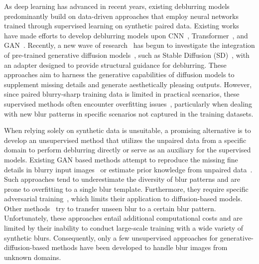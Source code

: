 As deep learning has advanced in recent years, existing deblurring models predominantly build on data-driven approaches that employ neural networks trained through supervised learning on synthetic paired data. Existing works have made efforts to develop deblurring models upon CNN~\cite{tao2018scale,nah2017deep}, Transformer~\cite{potlapalli2024promptir,chee2018airnet}, and GAN~\cite{kupyn2018deblurgan,zhang2019gan}. Recently, a new wave of research~\cite{zhang2024diff,lin2025diffbir,liu2024diff} has begun to investigate the integration of pre-trained generative diffusion models~\cite{ho2020denoising}, such as Stable Diffusion (SD)~\cite{rombach2022high}, with an adapter designed to provide structural guidance for deblurring. These approaches aim to harness the generative capabilities of diffusion models to supplement missing details and generate aesthetically pleasing outputs. However, since paired blurry-sharp training data is limited in practical scenarios, these supervised methods often encounter overfitting issues~\cite{pham2024blur2blur}, particularly when dealing with new blur patterns in specific scenarios not captured in the training datasets. 


When relying solely on synthetic data is unsuitable, a promising alternative is to develop an unsupervised method that utilizes the unpaired data from a specific domain to perform deblurring directly or serve as an auxiliary for the supervised models. Existing GAN based methods attempt to reproduce the missing fine details in blurry input images~\cite{yi2017dualgan,zhao2022fcl} or estimate prior knowledge from unpaired data~\cite{zhang2023neural,jiangxin2021learning,ren2020neural,jiang2023uncertainty}. Such approaches tend to underestimate the diversity of blur patterns and are prone to overfitting to a single blur template. Furthermore, they require specific adversarial training~\cite{goodfellow2014generative}, which limits their application to diffusion-based models. Other methods~\cite{pham2024blur2blur,wu2024id} try to transfer unseen blur to a certain blur pattern. Unfortunately, these approaches entail additional computational costs and are limited by their inability to conduct large-scale training with a wide variety of synthetic blurs. Consequently, only a few unsupervised approaches for generative-diffusion-based methods have been developed to handle blur images from unknown domains.


